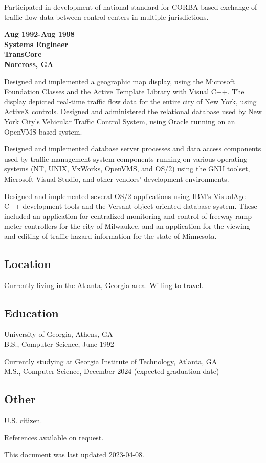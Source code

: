 Participated in development of national standard for CORBA-based
exchange of traffic flow data between control centers in multiple
jurisdictions.

\textbf{Aug 1992-Aug 1998\\
Systems Engineer\\
TransCore\\
Norcross, GA}

Designed and implemented a geographic map display, using the Microsoft
Foundation Classes and the Active Template Library with Visual C++. The
display depicted real-time traffic flow data for the entire city of New
York, using ActiveX controls. Designed and administered the relational
database used by New York City's Vehicular Traffic Control System, using
Oracle running on an OpenVMS-based system.

Designed and implemented database server processes and data access
components used by traffic management system components running on
various operating systems (NT, UNIX, VxWorks, OpenVMS, and OS/2) using
the GNU toolset, Microsoft Visual Studio, and other vendors' development
environments.

Designed and implemented several OS/2 applications using IBM's VisualAge
C++ development tools and the Versant object-oriented database system.
These included an application for centralized monitoring and control of
freeway ramp meter controllers for the city of Milwaukee, and an
application for the viewing and editing of traffic hazard information
for the state of Minnesota.

\hypertarget{location}{%
\subsection{Location}\label{location}}

Currently living in the Atlanta, Georgia area. Willing to travel.

\hypertarget{education}{%
\subsection{Education}\label{education}}

University of Georgia, Athens, GA\\
B.S., Computer Science, June 1992

Currently studying at Georgia Institute of Technology, Atlanta, GA\\
M.S., Computer Science, December 2024 (expected graduation date)

\hypertarget{other}{%
\subsection{Other}\label{other}}

U.S. citizen.

References available on request.

This document was last updated 2023-04-08.
